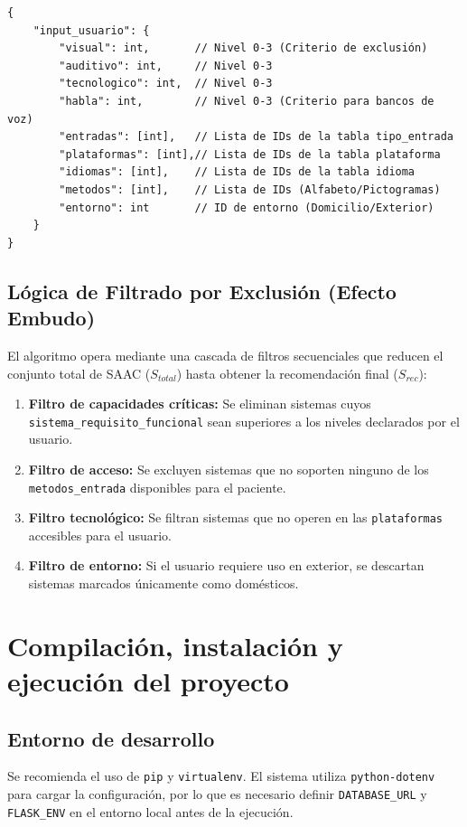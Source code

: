 \begin{verbatim}
{
    "input_usuario": {
        "visual": int,       // Nivel 0-3 (Criterio de exclusión)
        "auditivo": int,     // Nivel 0-3
        "tecnologico": int,  // Nivel 0-3
        "habla": int,        // Nivel 0-3 (Criterio para bancos de voz)
        "entradas": [int],   // Lista de IDs de la tabla tipo_entrada
        "plataformas": [int],// Lista de IDs de la tabla plataforma
        "idiomas": [int],    // Lista de IDs de la tabla idioma
        "metodos": [int],    // Lista de IDs (Alfabeto/Pictogramas)
        "entorno": int       // ID de entorno (Domicilio/Exterior)
    }
}
\end{verbatim}

\subsection{Lógica de Filtrado por Exclusión (Efecto Embudo)}
El algoritmo opera mediante una cascada de filtros secuenciales que reducen el conjunto total de SAAC ($S_{total}$) hasta obtener la recomendación final ($S_{rec}$):

\begin{enumerate}
    \item \textbf{Filtro de capacidades críticas:} Se eliminan sistemas cuyos \texttt{sistema\_requisito\_funcional} sean superiores a los niveles declarados por el usuario.
    \item \textbf{Filtro de acceso:} Se excluyen sistemas que no soporten ninguno de los \texttt{metodos\_entrada} disponibles para el paciente.
    \item \textbf{Filtro tecnológico:} Se filtran sistemas que no operen en las \texttt{plataformas} accesibles para el usuario.
    \item \textbf{Filtro de entorno:} Si el usuario requiere uso en exterior, se descartan sistemas marcados únicamente como domésticos.
\end{enumerate}

\section{Compilación, instalación y ejecución del proyecto}
\subsection{Entorno de desarrollo}
Se recomienda el uso de \texttt{pip} y \texttt{virtualenv}. El sistema utiliza \texttt{python-dotenv} para cargar la configuración, por lo que es necesario definir \texttt{DATABASE\_URL} y \texttt{FLASK\_ENV} en el entorno local antes de la ejecución.

